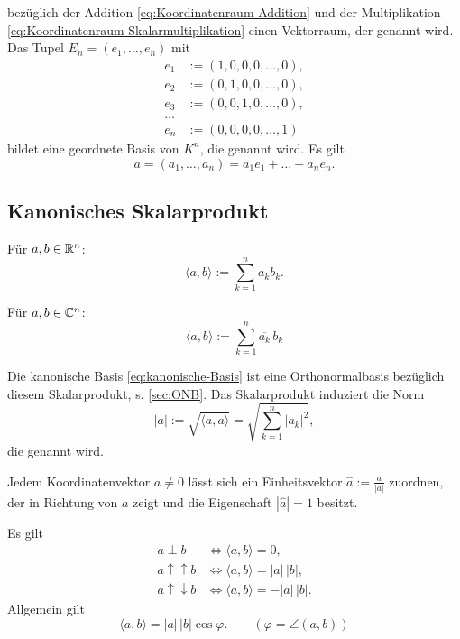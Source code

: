 bezüglich der Addition \eqref{eq:Koordinatenraum-Addition}
und der Multiplikation \eqref{eq:Koordinatenraum-Skalarmultiplikation}
einen Vektorraum, der  genannt wird.
Das Tupel $E_n=(e_1,\ldots,e_n)$ mit
\begin{equation}\label{eq:kanonische-Basis}
\begin{split}
e_1 &:= (1,0,0,0,\ldots, 0),\\
e_2 &:= (0,1,0,0,\ldots, 0),\\
e_3 &:= (0,0,1,0,\ldots, 0),\\
\ldots\\
e_n &:= (0,0,0,0,\ldots, 1)
\end{split}
\end{equation}
bildet eine geordnete Basis von $K^n$, die 
genannt wird. Es gilt
\begin{equation}
a = (a_1,\ldots,a_n) = a_1 e_1+\ldots+a_n e_n.
\end{equation}

\newpage
\subsection{Kanonisches Skalarprodukt}
\begin{definition}
Für $a,b\in\mathbb R^n$:
\begin{equation}
\langle a,b\rangle := \sum_{k=1}^n a_k b_k.
\end{equation}

Für $a,b\in\mathbb C^n$:
\begin{equation}
\langle a,b\rangle := \sum_{k=1}^n \overline{a_k}\,b_k
\end{equation}
\end{definition}
\noindent
Die kanonische Basis \eqref{eq:kanonische-Basis} ist eine
Orthonormalbasis bezüglich diesem Skalarprodukt, s. \ref{sec:ONB}.
Das Skalarprodukt induziert die Norm
\begin{equation}
|a| := \sqrt{\langle a,a\rangle} = \sqrt{\textstyle \sum_{k=1}^n |a_k|^2},
\end{equation}
die  genannt wird.

Jedem Koordinatenvektor $a\ne 0$ lässt sich ein Einheitsvektor
$\hat a:=\frac{a}{|a|}$ zuordnen, der in Richtung von $a$ zeigt
und die Eigenschaft $|\hat a|=1$ besitzt.

Es gilt
\begin{align}
a\perp b &\iff \langle a,b\rangle=0,\\
a\uparrow\uparrow b &\iff \langle a,b\rangle = |a|\,|b|,\\
a\uparrow\downarrow b &\iff \langle a,b\rangle = -|a|\,|b|.
\end{align}
Allgemein gilt
\begin{equation}
\langle a,b\rangle = |a|\,|b|\cos\varphi.\qquad(\varphi=\angle (a,b))
\end{equation}

